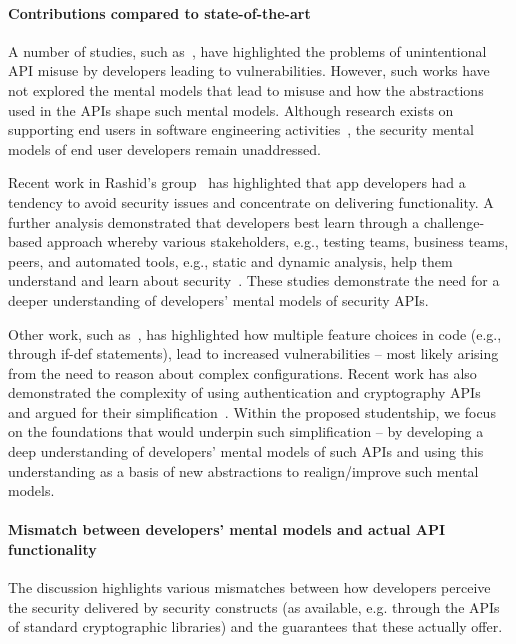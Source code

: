 \documentclass[10pt]{article}
\begin{document}
\paragraph{Contributions compared to state-of-the-art} 
A number of studies, such as~\cite{enck2011, fahl2012, fischer2017}, have highlighted the problems of unintentional API misuse by developers leading to vulnerabilities. However, such works have not explored the mental models that lead to misuse and how the abstractions used in the APIs shape such mental models. Although research exists on supporting end users in software engineering activities~\cite{ko2011}, the security mental models of end user developers remain unaddressed. 

Recent work in Rashid's group~\cite{weir2016} has highlighted that app developers had a tendency to avoid security issues and concentrate on delivering functionality. A further analysis demonstrated that developers best learn through a challenge-based approach whereby various stakeholders, e.g., testing teams, business teams, peers, and automated tools, e.g., static and dynamic analysis, help them understand and learn about security~\cite{weir2017}. These studies demonstrate the need for a deeper understanding of developers' mental models of security APIs. 

Other work, such as~\cite{ferreira2016}, has highlighted how multiple feature choices in code (e.g., through if-def statements), lead to increased vulnerabilities -- most likely arising from the need to reason about complex configurations.
Recent work has also demonstrated the complexity of using authentication and cryptography APIs~\cite{acar2017} and argued for their simplification~\cite{arzt2015, nadi2016}. Within the proposed studentship, we focus on the foundations that would underpin such simplification -- by developing a deep understanding of developers' mental models of such APIs and using this understanding as a basis of new abstractions to realign/improve such mental models.

\paragraph{Mismatch between developers' mental models and actual API functionality}
The discussion highlights various mismatches between how developers perceive the security delivered by security constructs (as available, e.g. through the APIs of standard cryptographic libraries) and the guarantees that these actually offer. 
\end{document}
